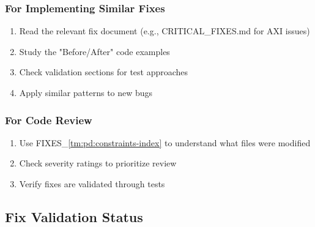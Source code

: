 \subsubsection{For Implementing Similar Fixes}\label{cr:fix:fixes-readme:for-implementing-similar-fixes}

\begin{record}

\begin{enumerate}
\def\labelenumi{\arabic{enumi}.}
\tightlist
\item
  Read the relevant fix document (e.g., CRITICAL\_\allowbreak{}FIXES.md
  for AXI issues)
\item
  Study the "Before/\allowbreak{}After" code examples
\item
  Check validation sections for test approaches
\item
  Apply similar patterns to new bugs
\end{enumerate}

\end{record}

\subsubsection{For Code Review}\label{cr:fix:fixes-readme:for-code-review}

\begin{record}

\begin{enumerate}
\def\labelenumi{\arabic{enumi}.}
\tightlist
\item
  Use FIXES\_\allowbreak{}\cref{tm:pd:constraints-index} to understand what files were
  modified
\item
  Check severity ratings to prioritize review
\item
  Verify fixes are validated through tests
\end{enumerate}

\end{record}

\subsection{Fix Validation Status}\label{cr:fix:fixes-readme:fix-validation-status}

